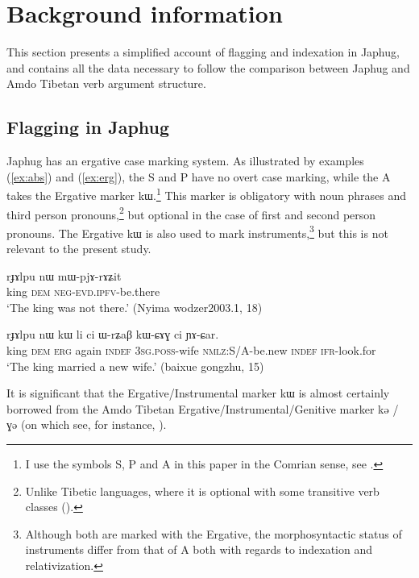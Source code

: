 \documentclass[oldfontcommands,oneside,a4paper,11pt]{article}
\newcommand{\ipa}[1]{{\phon \mbox{#1}}} %
\newcommand{\refb}[1]{(\ref{#1})}
\begin{document}
\section{Background information}
This section presents a simplified account of flagging and indexation in Japhug, and contains all the data necessary to follow the comparison between Japhug and Amdo Tibetan verb argument structure.

\subsection{Flagging in Japhug}
Japhug has an ergative case marking system. As illustrated by examples \refb{ex:abs} and \refb{ex:erg}, the S and P have no overt case marking, while the A takes the Ergative marker \ipa{kɯ}.\footnote{I use the symbols S, P and A in this paper in the Comrian sense, see \citet{haspelmath11SAPTR}.} This marker is obligatory with noun phrases and third person pronouns,\footnote{Unlike Tibetic languages, where it is optional with some transitive verb classes (\citealt{tournadre91}).} but optional in the case of first and second person pronouns.  The Ergative \ipa{kɯ} is also used to mark instruments,\footnote{Although both are marked with the Ergative, the morphosyntactic status of instruments differ from that of A both with regards to indexation and relativization.} but this is not relevant to the present study.

 \begin{exe}
\ex \label{ex:abs}
\gll
\ipa{rɟɤlpu}  	\ipa{nɯ}  	\ipa{mɯ-pjɤ-rɤʑit}  \\
king \textsc{dem} \textsc{neg-evd.ipfv}-be.there \\
 \glt `The king was not there.' (Nyima wodzer2003.1, 18)
\end{exe}

 \begin{exe}
\ex \label{ex:erg}
\gll 
\ipa{rɟɤlpu}  	\ipa{nɯ}  	\ipa{kɯ}  	\ipa{li}  	\ipa{ci}  	\ipa{ɯ-rʑaβ}  	\ipa{kɯ-ɕɤɣ}  	\ipa{ci}  	\ipa{ɲɤ-ɕar.}  	 \\
king \textsc{dem} \textsc{erg} again \textsc{indef} \textsc{3sg.poss}-wife \textsc{nmlz}:S/A-be.new \textsc{indef}  \textsc{ifr}-look.for \\
\glt `The king married a new wife.' (baixue gongzhu, 15)
\end{exe}

It is significant that the Ergative/Instrumental marker \ipa{kɯ} is almost certainly borrowed from the Amdo Tibetan Ergative/Instrumental/Genitive marker \ipa{kə} / \ipa{ɣə} (on which see, for instance, \citealt[62]{haller04themchen}).
\end{document}
